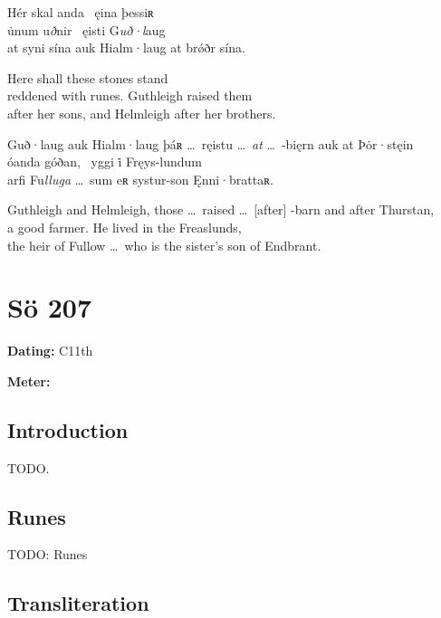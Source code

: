 \bpg\bpa[Sö 206]%
Hér skal anda \hld\ ęina þessiʀ \\
u̇num u\emph{ð}nir \hld\ ęisti G\emph{uð·l}aug \\
at syni sína auk Hialm·laug at brǿðr sína.\epa

\bpb Here shall these stones stand \\
reddened with runes.  Guthleigh raised them \\
after her sons, and Helmleigh after her brothers.\epb\epg


\bpg\bpa[Sö 208]%
\startsub Guð·laug auk Hialm·laug þáʀ \dots\ ręistu \dots\ \emph{at} \dots\ -bięrn auk at Þȯr·stęin\endsub \\
óanda góðan, \hld\ yggi i̇ Fręys-lundum \\
arfi Fu\emph{lluga} \dots\ sum eʀ systur-son Ęnni·brattaʀ.\epa

\bpb Guthleigh and Helmleigh, those \dots\ raised \dots\ [after] -barn and after Thurstan, \\
a good farmer.  He lived in the Freaslunds, \\
the heir of Fullow \dots\ who is the sister’s son of Endbrant.\epb\epg

\sectionline\clearpage


\section{Sö 207}

\begin{flushright}%
\textbf{Dating:} C11th

\textbf{Meter:} \Fornyrdislag
\end{flushright}%

\subsection{Introduction}

TODO.

\subsection{Runes}

TODO: Runes%

\subsection{Transliteration}

